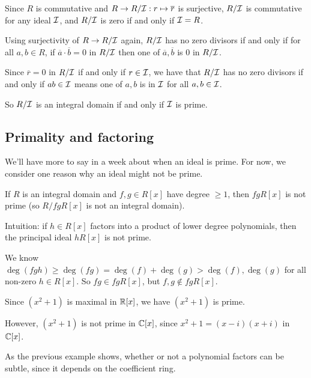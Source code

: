 \documentclass[12pt,letterpaper]{report}
\begin{document}
\begin{thmproof}
  Since $R$ is commutative and $R \to R/\mathcal{I} : r \mapsto \overline{r}$ is surjective, $R/\mathcal{I}$
  is commutative for any ideal $\mathcal{I}$, and $R/\mathcal{I}$ is zero if and only if $\mathcal{I} = R$.

  Using surjectivity of $R \to R/\mathcal{I}$ again, $R/\mathcal{I}$ has no zero divisors if and only if
  for all $a, b \in R$, if $\overline{a} \cdot \overline{b} = 0$ in $R/\mathcal{I}$ then one of
  $\overline{a}, \overline{b}$ is 0 in $R/\mathcal{I}$.

  Since $\overline{r} = 0$ in $R/\mathcal{I}$ if and only if $r \in \mathcal{I}$, we have that $R/\mathcal{I}$ has
  no zero divisors if and only if $ab \in \mathcal{I}$ means one of $a, b$ is in $\mathcal{I}$ for all
  $a, b \in \mathcal{I}$.

  So $R/\mathcal{I}$ is an integral domain if and only if $\mathcal{I}$ is prime.
\end{thmproof}

\pagebreak
\subsection{Primality and factoring}

We'll have more to say in a week about when an ideal is prime.
For now, we consider one reason why an ideal might not be prime.

\begin{lem}{}{}
  If $R$ is an integral domain and $f, g \in R[x]$ have degree $\geq 1$, then $fgR[x]$ is not prime
  (so $R/fgR[x]$ is not an integral domain).
\end{lem}

Intuition: if $h \in R[x]$ factors into a product of lower degree polynomials, then the principal
ideal $hR[x]$ is not prime.

\begin{thmproof}
  We know $\deg(fgh) \geq \deg(fg) = \deg(f) + \deg(g) > \deg(f), \deg(g)$ for all non-zero
  $h \in R[x]$.
  So $fg \in fgR[x]$, but $f, g \not\in fgR[x]$.
\end{thmproof}

\begin{ex}
  Since $(x^2 + 1)$ is maximal in $\mathbb{R}[x]$, we have $(x^2 + 1)$ is prime.

  However, $(x^2 + 1)$ is not prime in $\mathbb{C}[x]$, since $x^2 + 1 = (x - i)(x + i)$ in $\mathbb{C}[x]$.
\end{ex}

As the previous example shows, whether or not a polynomial factors can be subtle, since it depends
on the coefficient ring.
\end{document}
